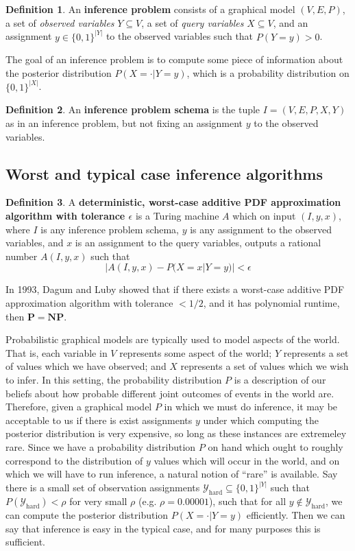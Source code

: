 \documentclass{article}
\renewcommand{\P}{\mathbf{P}}
\newcommand{\NP}{\mathbf{NP}}
\theoremstyle{definition}
\newtheorem{defn}{Definition}
\theoremstyle{remark}
\begin{document}
\begin{defn}
An \textbf{inference problem} consists of a graphical model $(V, E, P)$, a set of \textit{observed variables} $Y \subseteq V$, a set of \textit{query variables} $X \subseteq V$, and an assignment $y \in \{0, 1\}^{|Y|}$ to the observed variables such that $P(Y = y) > 0$.
\end{defn}
The goal of an inference problem is to compute some piece of information about the posterior distribution $P(X = \cdot | Y = y)$, which is a probability distribution on $\{0, 1\}^{|X|}$.

\begin{defn}
An \textbf{inference problem schema} is the tuple $I = (V, E, P, X, Y)$ as in an inference problem, but not fixing an assignment $y$ to the observed variables.
\end{defn}

\subsection{Worst and typical case inference algorithms}

\begin{defn}
A \textbf{deterministic, worst-case additive PDF approximation algorithm with tolerance $\epsilon$} is a Turing machine $A$ which on input
$(I, y, x)$, where $I$ is any inference problem schema, $y$ is any assignment to the observed variables, and $x$ is an assignment to the query variables, outputs a rational number $A(I, y, x)$ such that
$$
|A(I, y, x) - P(X = x | Y = y)| < \epsilon
$$
\end{defn}
In 1993, Dagum and Luby \cite{dagum1993} showed that if there exists a worst-case additive PDF approximation algorithm with tolerance $< 1/2$, and it has polynomial runtime, then $\P = \NP$.

Probabilistic graphical models are typically used to model aspects of the world.
That is, each variable in $V$ represents some aspect of the world; $Y$ represents a set of values which we have observed; and $X$ represents a set of values which we wish to infer.
In this setting, the probability distribution $P$ is a description of our beliefs about how probable different joint outcomes of events in the world are.
Therefore, given a graphical model $P$ in which we must do inference, it may be acceptable to us if there is exist assignments $y$ under which computing the posterior distribution is very expensive, so long as these instances are extremeley rare.
Since we have a probability distribution $P$ on hand which ought to roughly correspond to the distribution of $y$ values which will occur in the world, and on which we will have to run inference, a natural notion of ``rare'' is available.
Say there is a small set of observation assignments $\mathcal{Y}_\text{hard} \subseteq \{0, 1\}^{|Y|}$ such that $P(\mathcal{Y}_\text{hard}) < \rho$ for very small $\rho$ (e.g. $\rho = 0.00001$), such that for all $y \notin \mathcal{Y}_\text{hard}$, we can compute the posterior distribution $P(X = \cdot | Y = y)$ efficiently.
Then we can say that inference is easy in the typical case, and for many purposes this is sufficient.
\end{document}
